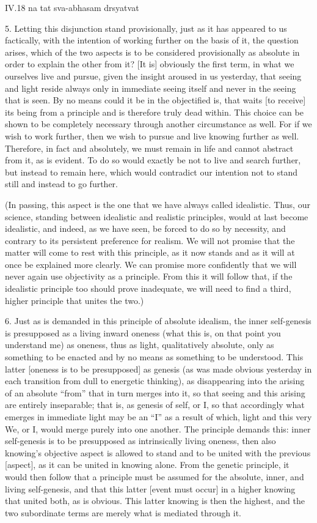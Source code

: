 IV.18
na tat sva-abhasam drsyatvat

5. Letting this disjunction stand provisionally,
just as it has appeared to us factically,
with the intention of working further
on the basis of it, the question arises,
which of the two aspects is to be
considered provisionally as absolute
in order to explain the other from it?
[It is] obviously the first term,
in what we ourselves live and pursue,
given the insight aroused in us yesterday,
that seeing and light reside always
only in immediate seeing itself and
never in the seeing that is seen.
By no means could it be in the objectified is,
that waits [to receive] its being from a principle
and is therefore truly dead within.
This choice can be shown to be completely necessary
through another circumstance as well.
For if we wish to work further,
then we wish to pursue and live knowing further as well.
Therefore, in fact and absolutely, we must remain in life
and cannot abstract from it, as is evident.
To do so would exactly be not to live and search further,
but instead to remain here,
which would contradict our intention
not to stand still and instead to go further.

(In passing, this aspect is the one
that we have always called idealistic.
Thus, our science, standing between
idealistic and realistic principles,
would at last become idealistic,
and indeed, as we have seen,
be forced to do so by necessity,
and contrary to its persistent
preference for realism.
We will not promise that the matter
will come to rest with this principle,
as it now stands and as it will
at once be explained more clearly.
We can promise more confidently that
we will never again use objectivity as a principle.
From this it will follow that,
if the idealistic principle too
should prove inadequate,
we will need to find a third, higher principle
that unites the two.)

6. Just as is demanded in this principle of absolute idealism,
the inner self-genesis is presupposed
as a living inward oneness
(what this is, on that point you understand me)
as oneness, thus as light, qualitatively absolute,
only as something to be enacted
and by no means as something to be understood.
This latter [oneness is to be presupposed] as genesis
(as was made obvious yesterday in each transition
from dull to energetic thinking),
as disappearing into the arising
of an absolute “from”
that in turn merges into it,
so that seeing and this arising are entirely inseparable;
that is, as genesis of self, or I,
so that accordingly what emerges in immediate light
may be an “I” as a result of which,
light and this very We, or I,
would merge purely into one another.
The principle demands this:
inner self-genesis is to be presupposed
as intrinsically living oneness,
then also knowing's objective aspect is
allowed to stand and to be united
with the previous [aspect],
as it can be united in knowing alone.
From the genetic principle,
it would then follow that a principle must be assumed for
the absolute, inner, and living self-genesis,
and that this latter [event must occur]
in a higher knowing that united both, as is obvious.
This latter knowing is then the highest,
and the two subordinate terms are
merely what is mediated through it.

